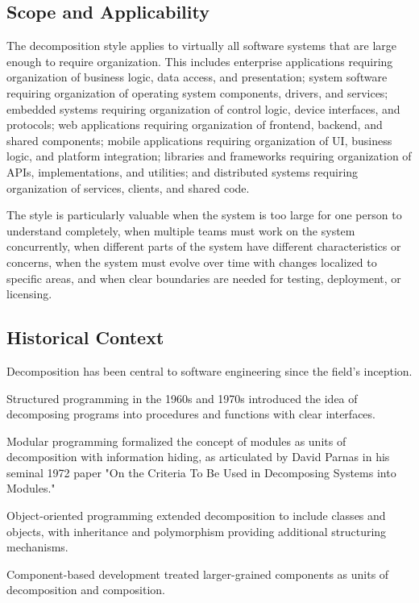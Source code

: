 \documentclass[11pt]{article}
\begin{document}
\subsection{Scope and Applicability}

The decomposition style applies to virtually all software systems that are large enough to require organization. This includes enterprise applications requiring organization of business logic, data access, and presentation; system software requiring organization of operating system components, drivers, and services; embedded systems requiring organization of control logic, device interfaces, and protocols; web applications requiring organization of frontend, backend, and shared components; mobile applications requiring organization of UI, business logic, and platform integration; libraries and frameworks requiring organization of APIs, implementations, and utilities; and distributed systems requiring organization of services, clients, and shared code.

The style is particularly valuable when the system is too large for one person to understand completely, when multiple teams must work on the system concurrently, when different parts of the system have different characteristics or concerns, when the system must evolve over time with changes localized to specific areas, and when clear boundaries are needed for testing, deployment, or licensing.

\subsection{Historical Context}

Decomposition has been central to software engineering since the field's inception.

Structured programming in the 1960s and 1970s introduced the idea of decomposing programs into procedures and functions with clear interfaces.

Modular programming formalized the concept of modules as units of decomposition with information hiding, as articulated by David Parnas in his seminal 1972 paper "On the Criteria To Be Used in Decomposing Systems into Modules."

Object-oriented programming extended decomposition to include classes and objects, with inheritance and polymorphism providing additional structuring mechanisms.

Component-based development treated larger-grained components as units of decomposition and composition.
\end{document}
